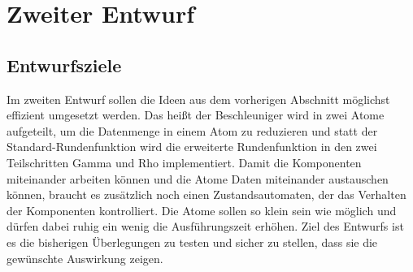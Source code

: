 \section{Zweiter Entwurf}

\subsection{Entwurfsziele}
Im zweiten Entwurf sollen die Ideen aus dem vorherigen Abschnitt möglichst effizient umgesetzt werden.
Das heißt der Beschleuniger wird in zwei Atome aufgeteilt, um die Datenmenge in einem Atom zu reduzieren
und statt der Standard-Rundenfunktion wird die erweiterte Rundenfunktion in den zwei Teilschritten Gamma und Rho implementiert.
Damit die Komponenten miteinander arbeiten können und die Atome Daten miteinander austauschen können, braucht es zusätzlich noch
einen Zustandsautomaten, der das Verhalten der Komponenten kontrolliert.
Die Atome sollen so klein sein wie möglich und dürfen dabei ruhig ein wenig die Ausführungszeit erhöhen.
Ziel des Entwurfs ist es die bisherigen Überlegungen zu testen und sicher zu stellen, dass sie die gewünschte Auswirkung zeigen.

